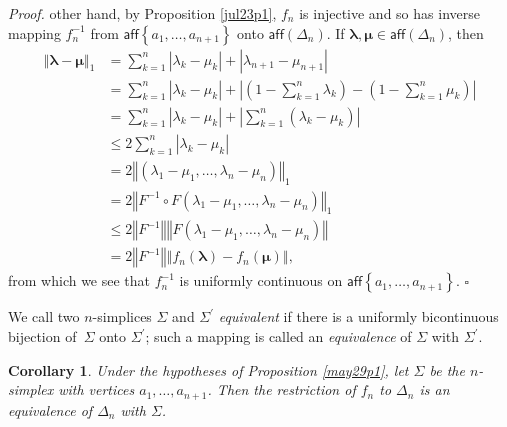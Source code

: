 \documentclass[11pt]{article}%
\newtheorem{corollary}[theorem]{Corollary}
\newenvironment{proof}[1][Proof]{\noindent\textit{#1.} }{}
\begin{document}
\begin{proof}
other hand, by Proposition \ref{jul23p1}, $f_{n}$ is injective and so has
inverse mapping $f_{n}^{-1}$ from $\mathsf{aff}\left\{  a_{1},\ldots
,a_{n+1}\right\}  $ onto $\mathsf{aff}(\Delta_{n})$. If $\mathbf{\lambda
},\mathbf{\mu}\in\mathsf{aff}(\Delta_{n})$, then%
\begin{align*}
\left\Vert \mathbf{\lambda}-\mathbf{\mu}\right\Vert _{1}  &  =%
{\textstyle\sum_{k=1}^{n}}
\left\vert \lambda_{k}-\mu_{k}\right\vert +\left\vert \lambda_{n+1}-\mu
_{n+1}\right\vert \\
&  =%
{\textstyle\sum_{k=1}^{n}}
\left\vert \lambda_{k}-\mu_{k}\right\vert +\left\vert \left(  1-\sum_{k=1}%
^{n}\lambda_{k}\right)  -\left(  1-\sum_{k=1}^{n}\mu_{k}\right)  \right\vert
\\
&  =\sum_{k=1}^{n}\left\vert \lambda_{k}-\mu_{k}\right\vert +\left\vert
\sum_{k=1}^{n}\left(  \lambda_{k}-\mu_{k}\right)  \right\vert \\
&  \leq2\sum_{k=1}^{n}\left\vert \lambda_{k}-\mu_{k}\right\vert \\
&  =2\left\Vert (\lambda_{1}-\mu_{1},\ldots,\lambda_{n}-\mu_{n})\right\Vert
_{1}\\
&  =2\left\Vert F^{-1}\circ F(\lambda_{1}-\mu_{1},\ldots,\lambda_{n}-\mu
_{n})\right\Vert _{1}\\
&  \leq2\left\Vert F^{-1}\right\Vert \left\Vert F(\lambda_{1}-\mu_{1}%
,\ldots,\lambda_{n}-\mu_{n})\right\Vert \\
&  =2\left\Vert F^{-1}\right\Vert \left\Vert f_{n}(\mathbf{\lambda}%
)-f_{n}(\mathbf{\mu})\right\Vert ,
\end{align*}
from which we see that $f_{n}^{-1}$ is uniformly continuous on $\mathsf{aff}%
\left\{  a_{1},\ldots,a_{n+1}\right\}  $.%
\hfill
$\square$
\end{proof}

We call two $n$-simplices $\Sigma$ and $\Sigma^{\prime}$ \emph{equivalent }if
there is a uniformly bicontinuous bijection of\emph{\ }$\Sigma$ onto
$\Sigma^{\prime}$; such a mapping is called an \emph{equivalence }of $\Sigma$
with $\Sigma^{\prime}$.

\begin{corollary}
\label{2507c1}Under the hypotheses of \emph{Proposition \ref{may29p1}}, let
$\Sigma$ be the $n$-simplex with vertices $a_{1},\ldots,a_{n+1}$. Then the
restriction of $f_{n}$ to $\Delta_{n}$ is an equivalence of $\Delta_{n}$ with
$\Sigma$.
\end{corollary}
\end{document}
